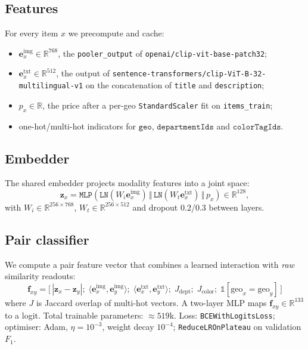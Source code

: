 \documentclass[10pt,conference]{IEEEtran}
\begin{document}
\subsection{Features}
For every item $x$ we precompute and cache:
\begin{itemize}
\item $\mathbf{e}_x^{\text{img}} \in \mathbb{R}^{768}$, the
\texttt{pooler\_output} of \texttt{openai/clip-vit-base-patch32};
\item $\mathbf{e}_x^{\text{txt}} \in \mathbb{R}^{512}$, the output of
\texttt{sentence-transformers/clip-ViT-B-32-multilingual-v1} on the
concatenation of \texttt{title} and \texttt{description};
\item $p_x \in \mathbb{R}$, the price after a per-geo \texttt{StandardScaler}
fit on \texttt{items\_train};
\item one-hot/multi-hot indicators for $\texttt{geo}$, $\texttt{departmentIds}$
and $\texttt{colorTagIds}$.
\end{itemize}

\subsection{Embedder}
The shared embedder projects modality features into a joint space:
\[
\mathbf{z}_x = \texttt{MLP}\!\left(
  \texttt{LN}(W_i \mathbf{e}_x^{\text{img}}) \,\Vert\,
  \texttt{LN}(W_t \mathbf{e}_x^{\text{txt}}) \,\Vert\,
  p_x
\right) \in \mathbb{R}^{128},
\]
with $W_i \in \mathbb{R}^{256\times 768}$, $W_t \in \mathbb{R}^{256\times
512}$ and dropout $0.2$/$0.3$ between layers.

\subsection{Pair classifier}
We compute a pair feature vector that combines a learned interaction with
\emph{raw} similarity readouts:
\[
\mathbf{f}_{xy} = \big[\,
  |\mathbf{z}_x - \mathbf{z}_y|;\;
  \langle \mathbf{e}_x^{\text{img}}, \mathbf{e}_y^{\text{img}}\rangle;\;
  \langle \mathbf{e}_x^{\text{txt}}, \mathbf{e}_y^{\text{txt}}\rangle;\;
  J_{\text{dept}};\;
  J_{\text{color}};\;
  \mathbb{1}[\text{geo}_x{=}\text{geo}_y]\,\big]
\]
where $J$ is Jaccard overlap of multi-hot vectors. A two-layer MLP maps
$\mathbf{f}_{xy} \in \mathbb{R}^{133}$ to a logit. Total trainable
parameters: $\approx 519$k. Loss: \texttt{BCEWithLogitsLoss}; optimiser:
Adam, $\eta=10^{-3}$, weight decay $10^{-4}$;
\texttt{ReduceLROnPlateau} on validation $F_1$.
\end{document}
